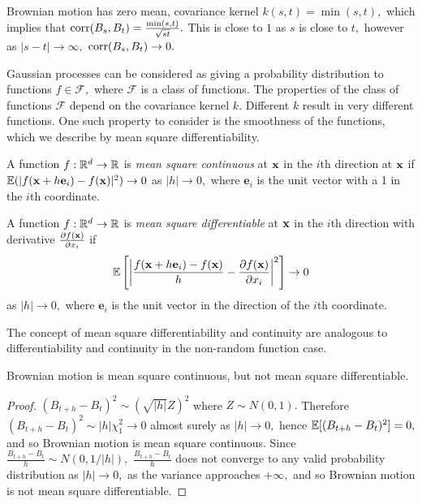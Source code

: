 Brownian motion has zero mean, covariance kernel $k(s, t) = \min(s, t),$ which
implies that $\operatorname{corr}(B_s, B_t) = \frac{\min(s, t)}{\sqrt{st}}.$ This is close to
$1$ as $s$ is close to $t,$ however as $|s-t|\to\infty,$
$\operatorname{corr}(B_s, B_t) \to 0.$

Gaussian processes can be considered as giving a probability distribution to
functions $f\in\mathcal{F},$ where $\mathcal{F}$ is a class of functions.
The properties of the class of functions
$\mathcal{F}$ depend on the covariance kernel $k.$ Different $k$ result
in very different functions. One such property to consider is the smoothness of
the functions, which we describe by mean square differentiability.

\begin{definition}
    A function $f:\mathbb{R}^d\to\mathbb{R}$ is \emph{mean square continuous} at $\mathbf{x}$
    in the $i$th direction at $\mathbf{x}$ if
    $\operatorname{\mathbb{E}}(|f(\mathbf{x} + h\mathbf{e}_i) - f(\mathbf{x})|^2)\to 0$ as $|h|\to 0,$
    where $\mathbf{e}_i$ is the unit vector with a 1 in the $i$th coordinate.
\end{definition}

\begin{definition}
    A function $f:\mathbb{R}^d\to\mathbb{R}$ is \emph{mean square differentiable} at
    $\mathbf{x}$ in the $i$th direction with derivative
    $\frac{\partial f(\mathbf{x})}{\partial x_i}$ if
    $$
        \operatorname{\mathbb{E}}\left[
            \left|
            \frac{f(\mathbf{x} + h\mathbf{e}_i) - f(\mathbf{x})}{h}
            - \frac{\partial f(\mathbf{x})}{\partial x_i}
            \right|^2
            \right]\to 0
    $$ as $|h|\to 0,$ where $\mathbf{e}_i$ is the unit vector in the direction
    of the $i$th coordinate.
\end{definition}

The concept of mean square differentiability and continuity are analogous to
differentiability and continuity in the non-random function case.

\begin{theorem}
    Brownian motion is mean square continuous, but not mean square
    differentiable.
\end{theorem}
\begin{proof}
    $(B_{t + h} - B_t)^2 \sim (\sqrt{|h|}Z)^2$ where $Z\sim N(0,1).$ Therefore
    $(B_{t + h} - B_t)^2 \sim |h|\chi_1^2 \to 0$ almost surely as $|h|\to 0,$
    hence $\operatorname{\mathbb{E}}[(B_{t + h} - B_t)^2] = 0,$ and so Brownian motion is
    mean square continuous. Since
    $\frac{B_{t + h} - B_t}{h} \sim N(0, 1/|h|),$ $\frac{B_{t + h} - B_t}{h}$
    does not converge to any valid probability distribution as $|h| \to 0,$ as
    the variance approaches $+\infty,$ and so Brownian motion is not
    mean square differentiable.
\end{proof}

